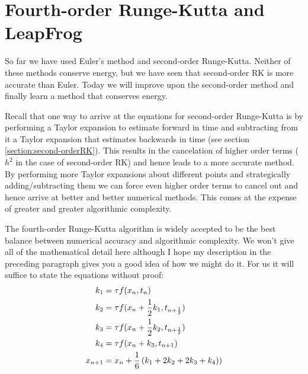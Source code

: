 \chapter{Fourth-order Runge-Kutta and LeapFrog}
\label{Lab:8}

So far we have used Euler's method and second-order Runge-Kutta.
Neither of these methods conserve energy, but we have seen that
second-order RK is more accurate than Euler.  Today we will improve upon the
second-order method and finally learn a method that
conserves energy.

 Recall that one way to arrive at
the equations for second-order Runge-Kutta is by performing a Taylor
expansion to estimate forward in time and subtracting from it a Taylor
expansion that estimates backwards in time (see section
\ref{section:second-orderRK}).  This results in the cancelation of
higher order terms ($h^2$ in the case of second-order RK) and hence
leads to a more accurate method. By performing more Taylor expansions
about different points and strategically adding/subtracting them we
can force even higher order terms to cancel out and hence arrive at
better and better numerical methods.  This comes at the expense of
greater and greater algorithmic complexity.

The fourth-order Runge-Kutta algorithm is widely accepted to be the best
balance between numerical accuracy and algorithmic complexity.  We
won't give all of the mathematical detail here although I hope my
description in the preceding paragraph gives you a good idea of how we
might do it.  For us it will suffice to state the equations without
proof:
\noindent
\begin{align}
k_1 &= \tau f(x_n,t_n)\\
k_2 &= \tau f(x_n + {1\over 2} k_1,t_{n+{1\over 2}})\\
k_3 &= \tau f(x_n + {1\over 2} k_2,t_{n+{1\over 2}})\label{eq:RK4-k3}\\
k_4 &= \tau f(x_n + k_3,t_{n+1}) \label{eq:RK4-k4}\\
x_{n+1} &= x_n + {1\over 6}\left( k_1 + 2 k_2 + 2 k_3 + k_4)\right) \label{eq:RK4-update}
\end{align}

